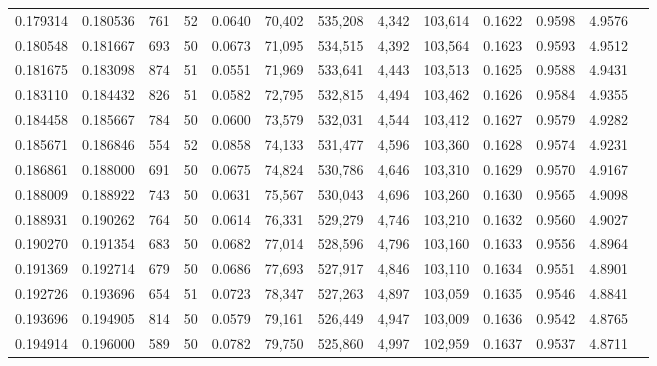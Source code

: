 \begin{tabular}{rrrrrrrrrrrrr}
0.179314 & 0.180536 &   761 &  52 &                                     0.0640 &  70,402 & 535,208 &   4,342 & 103,614 & 0.1622 & 0.9598 & 4.9576 \\
0.180548 & 0.181667 &   693 &  50 &                                     0.0673 &  71,095 & 534,515 &   4,392 & 103,564 & 0.1623 & 0.9593 & 4.9512 \\
0.181675 & 0.183098 &   874 &  51 &                                     0.0551 &  71,969 & 533,641 &   4,443 & 103,513 & 0.1625 & 0.9588 & 4.9431 \\
0.183110 & 0.184432 &   826 &  51 &                                     0.0582 &  72,795 & 532,815 &   4,494 & 103,462 & 0.1626 & 0.9584 & 4.9355 \\
0.184458 & 0.185667 &   784 &  50 &                                     0.0600 &  73,579 & 532,031 &   4,544 & 103,412 & 0.1627 & 0.9579 & 4.9282 \\
0.185671 & 0.186846 &   554 &  52 &                                     0.0858 &  74,133 & 531,477 &   4,596 & 103,360 & 0.1628 & 0.9574 & 4.9231 \\
0.186861 & 0.188000 &   691 &  50 &                                     0.0675 &  74,824 & 530,786 &   4,646 & 103,310 & 0.1629 & 0.9570 & 4.9167 \\
0.188009 & 0.188922 &   743 &  50 &                                     0.0631 &  75,567 & 530,043 &   4,696 & 103,260 & 0.1630 & 0.9565 & 4.9098 \\
0.188931 & 0.190262 &   764 &  50 &                                     0.0614 &  76,331 & 529,279 &   4,746 & 103,210 & 0.1632 & 0.9560 & 4.9027 \\
0.190270 & 0.191354 &   683 &  50 &                                     0.0682 &  77,014 & 528,596 &   4,796 & 103,160 & 0.1633 & 0.9556 & 4.8964 \\
0.191369 & 0.192714 &   679 &  50 &                                     0.0686 &  77,693 & 527,917 &   4,846 & 103,110 & 0.1634 & 0.9551 & 4.8901 \\
0.192726 & 0.193696 &   654 &  51 &                                     0.0723 &  78,347 & 527,263 &   4,897 & 103,059 & 0.1635 & 0.9546 & 4.8841 \\
0.193696 & 0.194905 &   814 &  50 &                                     0.0579 &  79,161 & 526,449 &   4,947 & 103,009 & 0.1636 & 0.9542 & 4.8765 \\
0.194914 & 0.196000 &   589 &  50 &                                     0.0782 &  79,750 & 525,860 &   4,997 & 102,959 & 0.1637 & 0.9537 & 4.8711 \\

\end{tabular}
